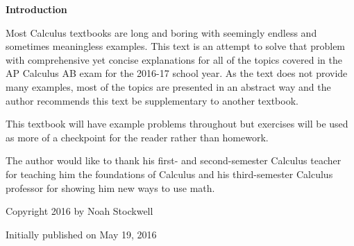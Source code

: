 \par \textbf{Introduction}
\newline
\vspace{0.125in}
\par Most Calculus textbooks are long and boring with seemingly endless and sometimes meaningless examples. This text is an attempt to solve that problem with comprehensive yet concise explanations for all of the topics covered in the AP Calculus AB exam for the 2016-17 school year. As the text does not provide many examples, most of the topics are presented in an abstract way and the author recommends this text be supplementary to another textbook.\\\par This textbook will have example problems throughout but exercises will be used as more of a checkpoint for the reader rather than homework.\\\par The author would like to thank his first- and second-semester Calculus teacher for teaching him the foundations of Calculus and his third-semester Calculus professor for showing him new ways to use math.
\vfill
\par Copyright 2016 by Noah Stockwell
\par Initially published on May 19, 2016